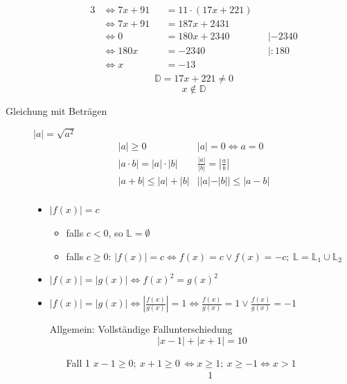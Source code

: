 \begin{description}
\begin{alignat*}{3}
        & \Leftrightarrow 7x + 91     &  & = 11 \cdot (17x+221)                          \\
        & \Leftrightarrow 7x + 91     &  & = 187x + 2431                                 \\
        & \Leftrightarrow 0           &  & = 180x +2340         &  & |-2340              \\
        & \Leftrightarrow 180x        &  & = -2340              &  & | :180              \\
        & \Leftrightarrow x           &  & = -13                                         \\
    \end{alignat*}
    \[\mathbb{D} = 17x+221 \not = 0\]
    \[x \not \in \mathbb{D}\]
    \item[Gleichung mit Beträgen] $|a| = \sqrt{a^2}$
    \[\begin{array}{ll}
          |a| \geq 0                  & |a| = 0 \Leftrightarrow a = 0              \\
          |a \cdot b| = |a| \cdot |b| & \frac{|a|}{|b|} = \left|\frac{a}{b}\right| \\
          |a+b| \leq  |a| + |b|         & ||a|-|b|| \leq |a-b|                       \\
    \end{array}\]
    \begin{itemize}
        \item $|f(x)| = c$ \
        \begin{itemize}
            \item falls $c<0$, so $\mathbb{L}= \emptyset$
            \item falls $c\geq0$: $|f(x)| = c \Leftrightarrow f(x) = c \vee f(x) = -c;\ \mathbb{L} = \mathbb{L}_1 \cup \mathbb{L}_2$
        \end{itemize}
        \item $|f(x)| = |g(x)| \Leftrightarrow f(x)^2 = g(x)^2$
        \item $|f(x)| = |g(x)| \Leftrightarrow \left|\frac{f(x)}{g(x)}\right| = 1 \Leftrightarrow \frac{f(x)}{g(x)} = 1 \vee \frac{f(x)}{g(x)} = -1$
        \item[Allgemein:] Vollständige Fallunterschiedung
        \[|x-1|+|x+1|=10\]
        \begin{itemize}
            \item[Fall 1] $x-1 \geq 0;\ x+1 \geq 0 \ \Leftrightarrow x \geq 1;\ x\geq -1 \Leftrightarrow x>1$
            \begin{alignat*} {1}

\end{alignat*}
\end{itemize}
\end{itemize}
\end{description}
